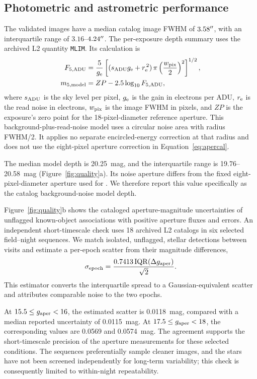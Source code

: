 \subsection{Photometric and astrometric performance}
\label{sec:photometry}

The validated images have a median catalog image FWHM of
$3.58^{\prime\prime}$, with an interquartile range of
$3.16$--$4.24^{\prime\prime}$. The per-exposure depth summary uses the
archived L2 quantity \texttt{MLIM}. Its calculation is
\begin{align}
F_{5,\rm ADU} &=
\frac{5}{g_{\rm e}}\left[(s_{\rm ADU}g_{\rm e}+r_{\rm e}^{\,2})
                 \,\pi\left(\frac{w_{\rm pix}}{2}\right)^2
                 \right]^{1/2},\\
m_{5,\rm model} &= ZP-2.5\log_{10} F_{5,\rm ADU},
\label{eq:depth}
\end{align}
where $s_{\rm ADU}$ is the sky level per pixel, $g_{\rm e}$ is
the gain in electrons per ADU, $r_{\rm e}$ is the read noise in
electrons, $w_{\rm pix}$ is the image FWHM in pixels, and $ZP$
is the exposure's zero point for the 18-pixel-diameter reference
aperture. This background-plus-read-noise model uses a circular noise
area with radius FWHM/2. It applies no separate encircled-energy
correction at that radius and does not use the eight-pixel aperture
correction in Equation~\ref{eq:apercal}.

The median model depth is 20.25~mag, and the interquartile range
is 19.76--20.58~mag (Figure~\ref{fig:quality}a). Its noise
aperture differs from the fixed eight-pixel-diameter aperture used for
\gaper. We therefore report this value specifically as the catalog
background-noise model depth.

Figure~\ref{fig:quality}b shows the cataloged aperture-magnitude
uncertainties of unflagged known-object associations with positive
aperture fluxes and errors. An independent
short-timescale check uses 18 archived L2 catalogs in six selected
field--night sequences. We match isolated, unflagged, stellar
detections between visits and estimate a per-epoch scatter from
their magnitude differences,
\begin{equation}
\sigma_{\rm epoch} =
\frac{0.7413\,\mathrm{IQR}(\Delta g_{\rm aper})}{\sqrt{2}}.
\label{eq:repeatability}
\end{equation}
This estimator converts the interquartile spread to a
Gaussian-equivalent scatter and attributes comparable noise
to the two epochs.

At $15.5\leq g_{\rm aper}<16$, the estimated scatter is 0.0118~mag,
compared with a median reported uncertainty of 0.0115~mag.
At $17.5\leq g_{\rm aper}<18$, the corresponding values are
0.0569 and 0.0574~mag. The agreement supports the short-timescale
precision of the aperture measurements for these selected
conditions. The sequences preferentially sample cleaner images,
and the stars have not been screened independently for
long-term variability; this check is consequently limited to
within-night repeatability.

